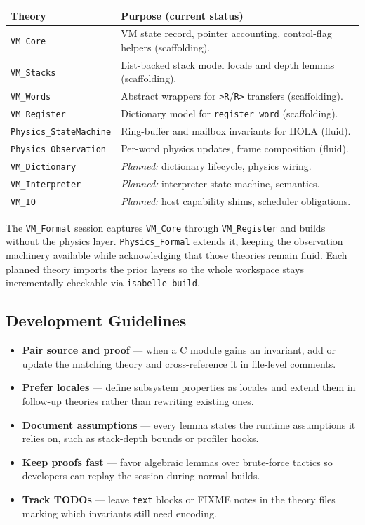 \begin{center}
\begin{tabular}{ll}
\toprule
Theory & Purpose (current status) \\
\midrule
\texttt{VM\_Core} & VM state record, pointer accounting, control-flag helpers (scaffolding). \\
\texttt{VM\_Stacks} & List-backed stack model locale and depth lemmas (scaffolding). \\
\texttt{VM\_Words} & Abstract wrappers for \texttt{>R}/\texttt{R>} transfers (scaffolding). \\
\texttt{VM\_Register} & Dictionary model for \texttt{register\_word} (scaffolding). \\
\texttt{Physics\_StateMachine} & Ring-buffer and mailbox invariants for HOLA (fluid). \\
\texttt{Physics\_Observation} & Per-word physics updates, frame composition (fluid). \\
\texttt{VM\_Dictionary} & \textit{Planned:} dictionary lifecycle, physics wiring. \\
\texttt{VM\_Interpreter} & \textit{Planned:} interpreter state machine, semantics. \\
\texttt{VM\_IO} & \textit{Planned:} host capability shims, scheduler obligations. \\
\bottomrule
\end{tabular}
\end{center}

The \texttt{VM\_Formal} session captures \texttt{VM\_Core} through
\texttt{VM\_Register} and builds without the physics layer. \texttt{Physics\_Formal}
extends it, keeping the observation machinery available while acknowledging that
those theories remain fluid. Each planned theory imports the prior layers so the
whole workspace stays incrementally checkable via \texttt{isabelle build}.

\subsection{Development Guidelines}

\begin{itemize}
  \item \textbf{Pair source and proof} --- when a C module gains an invariant, add or
        update the matching theory and cross-reference it in file-level comments.
  \item \textbf{Prefer locales} --- define subsystem properties as locales and extend
        them in follow-up theories rather than rewriting existing ones.
  \item \textbf{Document assumptions} --- every lemma states the runtime assumptions
        it relies on, such as stack-depth bounds or profiler hooks.
  \item \textbf{Keep proofs fast} --- favor algebraic lemmas over brute-force tactics
        so developers can replay the session during normal builds.
  \item \textbf{Track TODOs} --- leave \texttt{text} blocks or FIXME notes in the
        theory files marking which invariants still need encoding.
\end{itemize}

